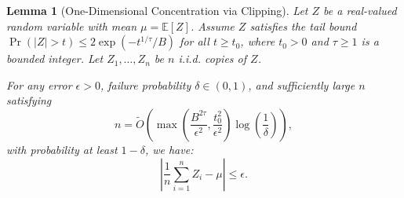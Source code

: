 \documentclass[11pt]{article}
\newcounter{thm}
\numberwithin{thm}{section}
\theoremstyle{plain}
\newtheorem{lemma}[thm]{Lemma}
\theoremstyle{definition}
\theoremstyle{remark} \newtheorem{remark}[thm]{Remark}
\newcommand{\E}{\mathbb{E}}
\begin{document}
\begin{lemma}[One-Dimensional Concentration via Clipping]\label{lemma:concentration-via-clipping}
Let $Z$ be a real-valued random variable with mean $\mu = \E[Z]$. 
Assume $Z$ satisfies the tail bound $\Pr(|Z| > t) \le 2\exp(-t^{1/\tau}/B)$ for all $t \ge t_0$, where $t_0 > 0$ and $\tau \ge 1$ is a bounded integer. 
Let $Z_1, \dots, Z_n$ be $n$ i.i.d. copies of $Z$.

For any error $\epsilon > 0$, failure probability $\delta \in (0, 1)$, and sufficiently large $n$ satisfying  
\[
n = \tilde{O}\left( \max\left( \frac{B^{2\tau}}{\epsilon^2}, \frac{t_0^2}{\epsilon^2} \right) \log \left( \frac 1 \delta \right) \right),
\]
with probability at least $1-\delta$, we have:
\[
\left| \frac{1}{n}\sum_{i=1}^n Z_i - \mu \right| \le \epsilon.
\]
\end{lemma}
\end{document}
